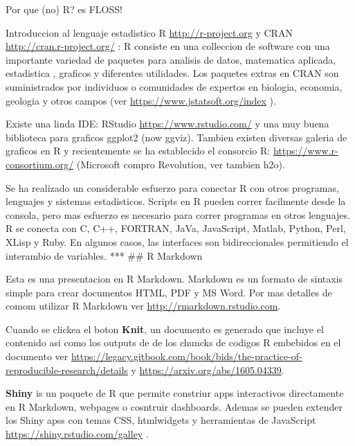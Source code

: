 \documentclass[ignorenonframetext,]{beamer}
\begin{document}
\begin{frame}{Por que (no) R? es FLOSS!}

Introduccion al lenguaje estadistico R \url{http://r-project.org} y CRAN
\url{http://cran.r-project.org/} : R consiste en una colleccion de
software con una importante variedad de paquetes para analisis de datos,
matematica aplicada, estadistica , graficos y diferentes utilidades. Los
paquetes extras en CRAN son suministrados por individuos o comunidades
de expertos en biologia, economia, geologia y otros campos (ver
\url{https://www.jstatsoft.org/index} ).

Existe una linda IDE: RStudio \url{https://www.rstudio.com/} y una muy
buena biblioteca para graficos ggplot2 (now ggviz). Tambien existen
diversas galeria de graficos en R y recientemente se ha establecido el
consorcio R: \url{https://www.r-consortium.org/} (Microsoft compro
Revolution, ver tambien h2o).

Se ha realizado un considerable esfuerzo para conectar R con otros
programas, lenguajes y sistemas estadisticos. Scripts en R pueden correr
facilmente desde la consola, pero mas esfuerzo es necesario para correr
programas en otros lenguajes. R se conecta con C, C++, FORTRAN, JaVa,
JavaScript, Matlab, Python, Perl, XLisp y Ruby. En algunos casos, las
interfaces son bidireccionales permitiendo el interambio de variables.
*** \#\# R Markdown

Esta es una presentacion en R Markdown. Markdown es un formato de
sintaxis simple para crear documentos HTML, PDF y MS Word. Por mas
detalles de comom utilizar R Markdown ver
\url{http://rmarkdown.rstudio.com}.

Cuando se clickea el boton \textbf{Knit}, un documento es generado que
incluye el contenido asi como los outputs de de los chuncks de codigos R
embebidos en el documento ver
\url{https://legacy.gitbook.com/book/bids/the-practice-of-reproducible-research/details}
y \url{https://arxiv.org/abs/1605.04339}.

\textbf{Shiny} is un paquete de R que permite constriur apps
interactivos directamente en R Markdown, webpages o cosntruir
dashboards. Ademas se pueden extender los Shiny apss con temas CSS,
htmlwidgets y herramientas de JavaScript
\url{https://shiny.rstudio.com/galley} .

\end{frame}
\end{document}
